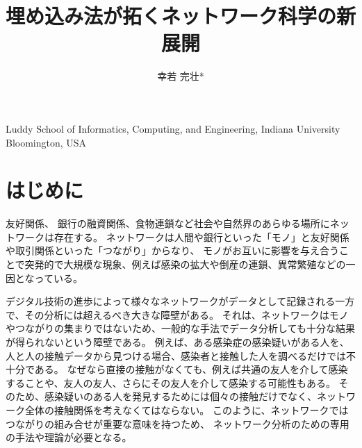 \documentclass[J]{scitrans}
\begin{document}
\title{埋め込み法が拓くネットワーク科学の新展開}
\author{幸若 完壮*}


\maketitle


\address{*}{Luddy School of Informatics, Computing, and Engineering, Indiana University Bloomington, USA}


\section{はじめに}
\label{sec:introduction}

友好関係、 銀行の融資関係、食物連鎖など社会や自然界のあらゆる場所にネットワークは存在する。
ネットワークは人間や銀行といった「モノ」と友好関係や取引関係といった「つながり」からなり、 
モノがお互いに影響を与え合うことで突発的で大規模な現象、例えば感染の拡大や倒産の連鎖、異常繁殖などの一因となっている\cite{}。

デジタル技術の進歩によって様々なネットワークがデータとして記録される一方で、その分析には超えるべき大きな障壁がある。
それは、ネットワークはモノやつながりの集まりではないため、一般的な手法でデータ分析しても十分な結果が得られないという障壁である。
例えば、ある感染症の感染疑いがある人を、人と人の接触データから見つける場合、感染者と接触した人を調べるだけでは不十分である。
なぜなら直接の接触がなくても、例えば共通の友人を介して感染することや、友人の友人、さらにその友人を介して感染する可能性もある。
そのため、感染疑いのある人を発見するためには個々の接触だけでなく、ネットワーク全体の接触関係を考えなくてはならない。
このように、ネットワークではつながりの組み合せが重要な意味を持つため、 ネットワーク分析のための専用の手法や理論が必要となる。
\end{document}

